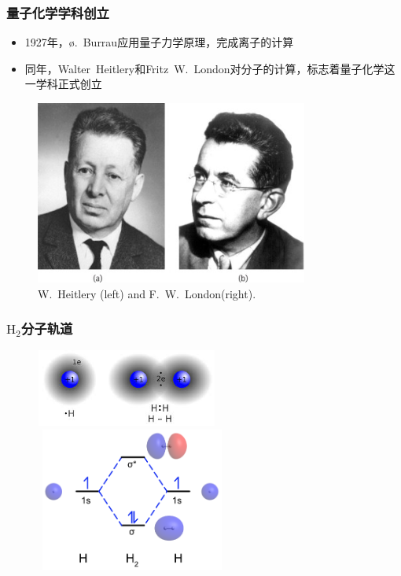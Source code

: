 \frame
{
	\frametitle{量子化学学科创立}
	\begin{itemize}
		\item \textrm{1927}年，\textrm{\o.~Burrau}应用量子力学原理，完成\textrm{}离子的计算
		\item 同年，\textrm{Walter~Heitlery}和\textrm{Fritz~W.~London}对\textrm{}分子的计算，标志着量子化学这一学科正式创立
	\end{itemize}
\begin{figure}[h!]
\centering
\vspace{-1.5pt}
\hspace*{-0.12in}
\includegraphics[height=0.48\textwidth,width=0.80\textwidth,viewport=0 10 260 175,clip]{Figures/Walter-Heitlery_Fritz-W-London.jpeg}
\caption{\textrm{W.~Heitlery (left) and F.~W.~London(right).}}
\label{Heitlery_London}
\end{figure}
}

\frame
{
	\frametitle{$\mathrm{H}_2$分子轨道}
\begin{figure}[h!]
\centering
\vspace{-15.5pt}
\includegraphics[height=1.0in,width=2.35in,viewport=0 0 350 150,clip]{Figures/H-bonding.jpeg}
\includegraphics[height=1.85in,width=2.50in,viewport=0 0 120 90,clip]{Figures/Molecular-orbital-diagram-H2.png}
\label{MO:H2}
\end{figure}
}


